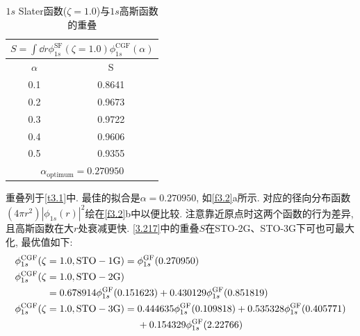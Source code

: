 \begin{table}[H]
	\centering
	\caption{$1s$ Slater函数($\zeta=1.0$)与$1s$高斯函数的重叠}
	\begin{tabular}{cc}
		\multicolumn{2}{c}{$ S=\int\dd{r}\phi_{1s}^\mathrm{SF}(\zeta=1.0)\phi_{1s}^\mathrm{CGF}(\alpha)$} \\ \hline
		$\alpha$ &                                           S                                            \\ \hline
		0.1    &                                         0.8641                                         \\
		0.2    &                                         0.9673                                         \\
		0.3    &                                         0.9722                                         \\
		0.4    &                                         0.9606                                         \\
		0.5    &                                         0.9355                                         \\ \hline
		\multicolumn{2}{c}{$\alpha_\mathrm{optimum}=0.270950$}
	\end{tabular}
	\label{t3.1}
\end{table}
重叠列于\autoref{t3.1}中. 
最佳的拟合是$\alpha=0.270950$, 
如\autoref{f3.2}a所示. 
对应的径向分布函数$(4\pi r^2)|\phi_{1s}(r)|^2$绘在\autoref{f3.2}b中以便比较. 
注意靠近原点时这两个函数的行为差异, 
且高斯函数在大$r$处衰减更快. 
\autoref{3.217}中的重叠$S$在STO-2G、STO-3G下可也可最大化, 
最优值如下:
\begin{alignat}{2}
	\label{3.219}
	\phi_{1s}^\mathrm{CGF}(\zeta&=1.0,\mathrm{STO-1G}) = \phi_{1s}^\mathrm{GF}(0.270950)\\
	\phi_{1s}^\mathrm{CGF}(\zeta&=1.0,\mathrm{STO-2G})\notag\\
	&=0.678914\phi_{1s}^\mathrm{GF}(0.151623) +0.430129\phi_{1s}^\mathrm{GF}(0.851819)\\
	\label{3.221}
	\phi_{1s}^\mathrm{CGF}(\zeta&=1.0,\mathrm{STO-3G})=
	\begin{alignedat}[t]{1}&0.444635\phi_{1s}^\mathrm{GF}(0.109818) + 0.535328\phi_{1s}^\mathrm{GF}(0.405771)\\& + 0.154329\phi_{1s}^\mathrm{GF}(2.22766)\end{alignedat}
\end{alignat}

